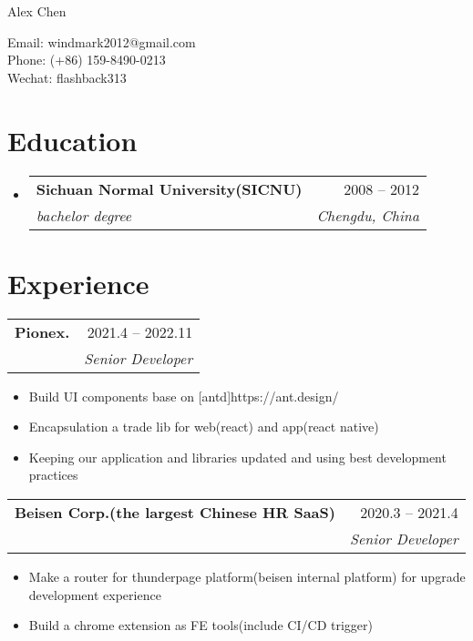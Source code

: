 \documentclass[letterpaper,11pt]{article}
\makeatletter
\newcommand{\resumeSubheading}[4]{
  \vspace{-2pt}\item
    \begin{tabular*}{0.97\textwidth}[t]{l@{\extracolsep{\fill}}r}
      \textbf{#1} & #2 \\
      \textit{\small #3} & \textit{\small #4} \\
    \end{tabular*}\vspace{-10pt}
}
\newcommand{\resumeSubHeadingListStart}{\begin{itemize}[leftmargin=0.15in, label={}]}
\newcommand{\resumeSubHeadingListEnd}{\end{itemize}}
\makeatother
\begin{document}
\begin{center}
    {\LARGE Alex Chen} \\ \vspace{0pt}
    \begin{multicols}{2}
    \begin{flushleft}
    \large{Email: windmark2012@gmail.com} \\
    \large{Phone: (+86) 159-8490-0213} \\
    \large{Wechat: flashback313} \\
    \end{flushleft}
    \end{multicols}
\end{center}


\section{Education}
\resumeSubHeadingListStart

    \resumeSubheading
        {Sichuan Normal University(SICNU)}{2008 -- 2012}
        {bachelor degree}{Chengdu, China}

\resumeSubHeadingListEnd


\section{Experience}
\resumeSubheading{\textbf{Pionex.}}
    {2021.4 -- 2022.11}
  \role{Senior Developer}
  \begin{itemize}
  \item Build UI components base on [antd]{https://ant.design/}
  \item Encapsulation a trade lib for web(react) and app(react native)
  \item Keeping our application and libraries updated and using best development practices
\end{itemize}
\resumeSubheading{\textbf{Beisen Corp.(the largest Chinese HR SaaS)}}{2020.3 -- 2021.4}
\role{Senior Developer}
\begin{itemize}
  \item Make a router for thunderpage platform(beisen internal platform) for upgrade development experience
  \item Build a chrome extension as FE tools(include CI/CD trigger)
\end{itemize}
\end{document}
